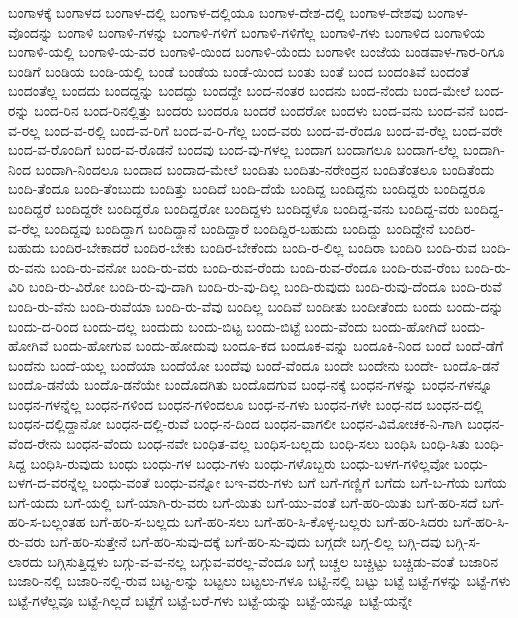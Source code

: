 {ಬಂಗಾಳಕ್ಕೆ
ಬಂಗಾಳದ
ಬಂಗಾಳ-ದಲ್ಲಿ
ಬಂಗಾಳ-ದಲ್ಲಿಯೂ
ಬಂಗಾಳ-ದೇಶ-ದಲ್ಲಿ
ಬಂಗಾಳ-ದೇಶವು
ಬಂಗಾಳ-ವೊಂದನ್ನು
ಬಂಗಾಳಿ
ಬಂಗಾಳಿ-ಗಳನ್ನು
ಬಂಗಾಳಿ-ಗಳಿಗೆ
ಬಂಗಾಳಿ-ಗಳಿಗೆಲ್ಲ
ಬಂಗಾಳಿ-ಗಳು
ಬಂಗಾಳಿದ
ಬಂಗಾಳಿಯ
ಬಂಗಾಳಿ-ಯಲ್ಲಿ
ಬಂಗಾಳಿ-ಯ-ವರ
ಬಂಗಾಳಿ-ಯಿಂದ
ಬಂಗಾಳಿ-ಯೆಂದು
ಬಂಗಾಳೀ
ಬಂಜೆಯ
ಬಂಡವಾಳ-ಗಾರ-ರಿಗೂ
ಬಂಡಿಗೆ
ಬಂಡಿಯ
ಬಂಡಿ-ಯಲ್ಲಿ
ಬಂಡೆ
ಬಂಡೆಯ
ಬಂಡೆ-ಯಿಂದ
ಬಂತು
ಬಂತೆ
ಬಂದ
ಬಂದಂತಿವೆ
ಬಂದಂತೆ
ಬಂದಂತೆಲ್ಲ
ಬಂದದು
ಬಂದದ್ದನ್ನು
ಬಂದದ್ದು
ಬಂದದ್ದೇ
ಬಂದ-ನಂತರ
ಬಂದನು
ಬಂದ-ನೆಂದು
ಬಂದ-ಮೇಲೆ
ಬಂದ-ರನ್ನು
ಬಂದ-ರಿನ
ಬಂದ-ರಿನಲ್ಲಿತ್ತು
ಬಂದರು
ಬಂದರೂ
ಬಂದರೆ
ಬಂದರೋ
ಬಂದಳು
ಬಂದ-ವನು
ಬಂದ-ವನೆ
ಬಂದ-ವ-ರಲ್ಲ
ಬಂದ-ವ-ರಲ್ಲಿ
ಬಂದ-ವ-ರಿಗೆ
ಬಂದ-ವ-ರಿ-ಗೆಲ್ಲ
ಬಂದ-ವರು
ಬಂದ-ವ-ರೆಂದೂ
ಬಂದ-ವ-ರೆಲ್ಲ
ಬಂದ-ವರೇ
ಬಂದ-ವ-ರೊಂದಿಗೆ
ಬಂದ-ವ-ರೊಡನೆ
ಬಂದವು
ಬಂದ-ವು-ಗಳಲ್ಲ
ಬಂದಾಗ
ಬಂದಾಗಲೂ
ಬಂದಾಗ-ಲೆಲ್ಲ
ಬಂದಾಗಿ-ನಿಂದ
ಬಂದಾಗಿ-ನಿಂದಲೂ
ಬಂದಾದ
ಬಂದಾದ-ಮೇಲೆ
ಬಂದಿತು
ಬಂದಿತು-ನರೇಂದ್ರನ
ಬಂದಿತೆಂತಲೂ
ಬಂದಿತೆಂದು
ಬಂದಿ-ತೆಂದೂ
ಬಂದಿ-ತೆಂಬುದು
ಬಂದಿತ್ತು
ಬಂದಿದೆ
ಬಂದಿ-ದೆಯೆ
ಬಂದಿದ್ದ
ಬಂದಿದ್ದನು
ಬಂದಿದ್ದರು
ಬಂದಿದ್ದರೂ
ಬಂದಿದ್ದರೆ
ಬಂದಿದ್ದರೇ
ಬಂದಿದ್ದರೊ
ಬಂದಿದ್ದರೋ
ಬಂದಿದ್ದಳು
ಬಂದಿದ್ದಳೊ
ಬಂದಿದ್ದ-ವನು
ಬಂದಿದ್ದ-ವರು
ಬಂದಿದ್ದ-ವ-ರೆಲ್ಲ
ಬಂದಿದ್ದವು
ಬಂದಿದ್ದಾಗ
ಬಂದಿದ್ದಾನೆ
ಬಂದಿದ್ದಾರೆ
ಬಂದಿದ್ದಿರ-ಬಹುದು
ಬಂದಿದ್ದು
ಬಂದಿದ್ದೇನೆ
ಬಂದಿರ-ಬಹುದು
ಬಂದಿರ-ಬೇಕಾದರೆ
ಬಂದಿರ-ಬೇಕು
ಬಂದಿರ-ಬೇಕೆಂದು
ಬಂದಿ-ರ-ಲಿಲ್ಲ
ಬಂದಿರಾ
ಬಂದಿರಿ
ಬಂದಿ-ರುವ
ಬಂದಿ-ರು-ವನು
ಬಂದಿ-ರು-ವನೋ
ಬಂದಿ-ರು-ವರು
ಬಂದಿ-ರುವ-ರೆಂದು
ಬಂದಿ-ರುವ-ರೆಂದೂ
ಬಂದಿ-ರುವ-ರೆಂಬ
ಬಂದಿ-ರು-ವಿರಿ
ಬಂದಿ-ರು-ವಿರೋ
ಬಂದಿ-ರು-ವು-ದಾಗಿ
ಬಂದಿ-ರು-ವು-ದಿಲ್ಲ
ಬಂದಿ-ರುವುದು
ಬಂದಿ-ರುವು-ದೆಂದೂ
ಬಂದಿ-ರುವೆ
ಬಂದಿ-ರು-ವೆನು
ಬಂದಿ-ರುವೆಯಾ
ಬಂದಿ-ರು-ವೆವು
ಬಂದಿಲ್ಲ
ಬಂದಿವೆ
ಬಂದೀತು
ಬಂದೀತೆಂದು
ಬಂದು
ಬಂದು-ದನ್ನು
ಬಂದು-ದ-ರಿಂದ
ಬಂದು-ದಲ್ಲ
ಬಂದುದು
ಬಂದು-ಬಿಟ್ಟ
ಬಂದು-ಬಿಟ್ಟೆ
ಬಂದು-ವೆಂದು
ಬಂದು-ಹೋಗಿದೆ
ಬಂದು-ಹೋಗಿವೆ
ಬಂದು-ಹೋಗುವ
ಬಂದು-ಹೋದುವು
ಬಂದೂ-ಕದ
ಬಂದೂಕ-ವನ್ನು
ಬಂದೂಕಿ-ನಿಂದ
ಬಂದೆ
ಬಂದೆ-ಡೆಗೆ
ಬಂದೆನು
ಬಂದೆ-ಯಲ್ಲ
ಬಂದೆಯಾ
ಬಂದೆಯೋ
ಬಂದೆವು
ಬಂದೆ-ವೆಂದೂ
ಬಂದೇ
ಬಂದೇನು
ಬಂದೇ-
ಬಂದೊ-ಡನೆ
ಬಂದೊ-ಡನೆಯೆ
ಬಂದೊ-ಡನೆಯೇ
ಬಂದೊದಗಿತು
ಬಂದೊದಗುವ
ಬಂಧ-ನಕ್ಕೆ
ಬಂಧನ-ಗಳನ್ನು
ಬಂಧನ-ಗಳನ್ನೂ
ಬಂಧನ-ಗಳನ್ನೆಲ್ಲ
ಬಂಧನ-ಗಳಿಂದ
ಬಂಧನ-ಗಳಿಂದಲೂ
ಬಂಧ-ನ-ಗಳು
ಬಂಧನ-ಗಳೇ
ಬಂಧ-ನದ
ಬಂಧನ-ದಲ್ಲಿ
ಬಂಧನ-ದಲ್ಲಿದ್ದಾನೋ
ಬಂಧನ-ದಲ್ಲಿ-ರುವೆ
ಬಂಧ-ನ-ದಿಂದ
ಬಂಧನ-ವಾಗಲೀ
ಬಂಧನ-ವಿಮೋಚಕ-ನಿ-ಗಾಗಿ
ಬಂಧನ-ವೆಂದ-ರೇನು
ಬಂಧನ-ವೆಂದು
ಬಂಧ-ನವೇ
ಬಂಧಿತ-ವಲ್ಲ
ಬಂಧಿಸ-ಬಲ್ಲದು
ಬಂಧಿ-ಸಲು
ಬಂಧಿಸಿ
ಬಂಧಿ-ಸಿತು
ಬಂಧಿ-ಸಿದ್ದ
ಬಂಧಿಸಿ-ರುವುದು
ಬಂಧು
ಬಂಧು-ಗಳ
ಬಂಧು-ಗಳು
ಬಂಧು-ಗಳೊಬ್ಬರು
ಬಂಧು-ಬಳಗ-ಗಳಿಲ್ಲವೋ
ಬಂಧು-ಬಳಗ-ದ-ವರನ್ನೆಲ್ಲ
ಬಂಧು-ವಂತೆ
ಬಂಧು-ವನ್ನೋ
ಬಇ-ವರು-ಗಳು
ಬಗೆ
ಬಗೆ-ಗಣ್ಣಿಗೆ
ಬಗೆದು
ಬಗೆ-ಬ-ಗೆಯ
ಬಗೆಯ
ಬಗೆ-ಯದು
ಬಗೆ-ಯಲ್ಲಿ
ಬಗೆ-ಯಾಗಿ-ರು-ವರು
ಬಗೆ-ಯಿತು
ಬಗೆ-ಯು-ವಂತೆ
ಬಗೆ-ಹರಿ-ಯಿತು
ಬಗೆ-ಹರಿ-ಸದೆ
ಬಗೆ-ಹರಿ-ಸ-ಬಲ್ಲಂತಹ
ಬಗೆ-ಹರಿ-ಸ-ಬಲ್ಲದು
ಬಗೆ-ಹರಿ-ಸಲು
ಬಗೆ-ಹರಿ-ಸಿ-ಕೊಳ್ಳ-ಬಲ್ಲರು
ಬಗೆ-ಹರಿ-ಸಿದರು
ಬಗೆ-ಹರಿ-ಸಿ-ರು-ವರು
ಬಗೆ-ಹರಿ-ಸುತ್ತೇನೆ
ಬಗೆ-ಹರಿ-ಸುವು-ದಕ್ಕೆ
ಬಗೆ-ಹರಿ-ಸು-ವುದು
ಬಗ್ಗದೇ
ಬಗ್ಗ-ಲಿಲ್ಲ
ಬಗ್ಗಿ-ದವು
ಬಗ್ಗಿ-ಸ-ಲಾರದು
ಬಗ್ಗಿಸುತ್ತಿದ್ದಳು
ಬಗ್ಗು-ವ-ವ-ನಲ್ಲ
ಬಗ್ಗುವ-ವರಲ್ಲ-ವೆಂದೂ
ಬಗ್ಗೆ
ಬಚ್ಚಲ
ಬಚ್ಚಿಟ್ಟು
ಬಚ್ಚಿಡು-ವಂತೆ
ಬಜಾರಿನ
ಬಜಾರಿ-ನಲ್ಲಿ
ಬಜಾರಿ-ನಲ್ಲಿ-ರುವ
ಬಟ್ಟ-ಲನ್ನು
ಬಟ್ಟಲು
ಬಟ್ಟಲು-ಗಳೂ
ಬಟ್ಟಿ-ನಲ್ಲಿ
ಬಟ್ಟು
ಬಟ್ಟೆ
ಬಟ್ಟೆ-ಗಳನ್ನು
ಬಟ್ಟೆ-ಗಳು
ಬಟ್ಟೆ-ಗಳೆಲ್ಲವೂ
ಬಟ್ಟೆ-ಗಿಲ್ಲದೆ
ಬಟ್ಟೆಗೆ
ಬಟ್ಟೆ-ಬರೆ-ಗಳು
ಬಟ್ಟೆ-ಯನ್ನು
ಬಟ್ಟೆ-ಯನ್ನೂ
ಬಟ್ಟೆ-ಯನ್ನೇ
}
